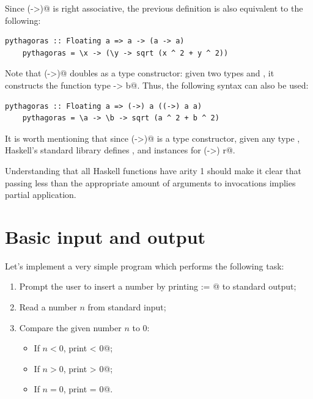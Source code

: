 \documentclass[UdineBachThesis,american,11pt,draft]{PhdThesis}
\begin{document}
  Since \lstinline@(->)@ is right associative, the previous definition is also
  equivalent to the following:

  \begin{lstlisting}[gobble=4,basicstyle=\ttfamily\small]
    pythagoras :: Floating a => a -> (a -> a)
    pythagoras = \x -> (\y -> sqrt (x ^ 2 + y ^ 2))
  \end{lstlisting}

  Note that \lstinline@(->)@ doubles as a type constructor: given two types
  \lstinline@a@ and \lstinline@b@, it constructs the function type
  \lstinline@a -> b@. Thus, the following syntax can also be used:

  \begin{lstlisting}[gobble=4,basicstyle=\ttfamily\small]
    pythagoras :: Floating a => (->) a ((->) a a)
    pythagoras = \a -> \b -> sqrt (a ^ 2 + b ^ 2)
  \end{lstlisting}

  It is worth mentioning that since \lstinline@(->)@ is a type constructor,
  given any type \lstinline@r@, Haskell's standard library defines
  \lstinline@Functor@, \lstinline@Applicative@ and \lstinline@Monad@ instances
  for \lstinline@(->) r@.

  Understanding that all Haskell functions have arity 1 should make it clear
  that passing less than the appropriate amount of arguments to invocations
  implies partial application.

  \section{Basic input and output}

  Let's implement a very simple program which performs the following task:

  \begin{enumerate}
    \item Prompt the user to insert a number by printing \lstinline@n := @ to
    standard output;

    \item Read a number $n$ from standard input;

    \item Compare the given number $n$ to $0$:
    \begin{itemize}[noitemsep]
      \item If $n < 0$, print \lstinline@n < 0@;
      \item If $n > 0$, print \lstinline@n > 0@;
      \item If $n = 0$, print \lstinline@n = 0@.
    \end{itemize}
  \end{enumerate}
\end{document}
